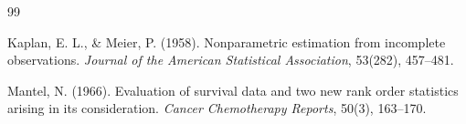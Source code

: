\documentclass[12pt, a4paper]{article}
\begin{document}

\begin{thebibliography}{99}

Kaplan, E. L., \& Meier, P. (1958).
Nonparametric estimation from incomplete observations.
\textit{Journal of the American Statistical Association}, 53(282), 457--481.

Mantel, N. (1966).
Evaluation of survival data and two new rank order statistics arising in its consideration.
\textit{Cancer Chemotherapy Reports}, 50(3), 163--170.

\end{thebibliography}
\end{document}
